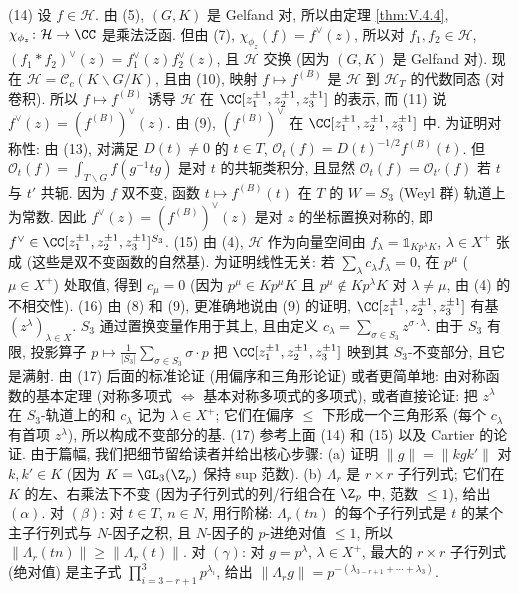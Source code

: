 \begin{solution}
(14) 设 $f \in \mathcal{H}$. 由 (5), $(G, K)$ 是 Gelfand 对, 所以由定理 \ref{thm:V.4.4}, $\chi_{\phi_z} \colon \mathcal{H} \to \CC$ 是乘法泛函. 但由 (7), $\chi_{\phi_z}(f) = f^{\vee}(z)$, 所以对 $f_1, f_2 \in \mathcal{H}$, $(f_1 * f_2)^{\vee}(z) = f_1^{\vee}(z)f_2^{\vee}(z)$, 且 $\mathcal{H}$ 交换 (因为 $(G, K)$ 是 Gelfand 对). 现在 $\mathcal{H} = \mathcal{C}_c(K\backslash G/K)$, 且由 (10), 映射 $f \longmapsto f^{(B)}$ 是 $\mathcal{H}$ 到 $\mathcal{H}_T$ 的代数同态 (对卷积). 所以 $f \mapsto f^{(B)}$ 诱导 $\mathcal{H}$ 在 $\CC[z_1^{\pm 1}, z_2^{\pm 1}, z_3^{\pm 1}]$ 的表示, 而 (11) 说 $f^{\vee}(z) = (f^{(B)})^{\vee}(z)$. 由 (9), $(f^{(B)})^{\vee}$ 在 $\CC[z_1^{\pm 1}, z_2^{\pm 1}, z_3^{\pm 1}]$ 中. 为证明对称性: 由 (13), 对满足 $D(t) \neq 0$ 的 $t \in T$, $\mathcal{O}_t(f) = D(t)^{-1/2}f^{(B)}(t)$. 但 $\mathcal{O}_t(f) = \int_{T\backslash G}f(g^{-1}tg)$ 是对 $t$ 的共轭类积分, 且显然 $\mathcal{O}_t(f) = \mathcal{O}_{t'}(f)$ 若 $t$ 与 $t'$ 共轭. 因为 $f$ 双不变, 函数 $t \longmapsto f^{(B)}(t)$ 在 $T$ 的 $W = S_3$ (Weyl 群) 轨道上为常数. 因此 $f^{\vee}(z) = (f^{(B)})^{\vee}(z)$ 是对 $z$ 的坐标置换对称的, 即 $f^{\vee} \in \CC[z_1^{\pm 1}, z_2^{\pm 1}, z_3^{\pm 1}]^{S_3}$.
(15) 由 (4), $\mathcal{H}$ 作为向量空间由 $f_{\lambda} = \mathbb{1}_{Kp^{\lambda}K}$, $\lambda \in X^+$ 张成 (这些是双不变函数的自然基). 为证明线性无关: 若 $\sum_{\lambda}c_{\lambda}f_{\lambda} = 0$, 在 $p^{\mu}$ ($\mu \in X^+$) 处取值, 得到 $c_{\mu} = 0$ (因为 $p^{\mu} \in Kp^{\mu}K$ 且 $p^{\mu} \notin Kp^{\lambda}K$ 对 $\lambda \neq \mu$, 由 (4) 的不相交性).
(16) 由 (8) 和 (9), 更准确地说由 (9) 的证明, $\CC[z_1^{\pm 1}, z_2^{\pm 1}, z_3^{\pm 1}]$ 有基 $(z^{\lambda})_{\lambda \in X}$. $S_3$ 通过置换变量作用于其上, 且由定义 $c_{\lambda} = \sum_{\sigma \in S_3}z^{\sigma \cdot \lambda}$. 由于 $S_3$ 有限, 投影算子 $p \longmapsto \frac{1}{|S_3|}\sum_{\sigma \in S_3}\sigma \cdot p$ 把 $\CC[z_1^{\pm 1}, z_2^{\pm 1}, z_3^{\pm 1}]$ 映到其 $S_3$-不变部分, 且它是满射. 由 (17) 后面的标准论证 (用偏序和三角形论证) 或者更简单地: 由对称函数的基本定理 (对称多项式 $\Leftrightarrow$ 基本对称多项式的多项式), 或者直接论证: 把 $z^{\lambda}$ 在 $S_3$-轨道上的和 $c_{\lambda}$ 记为 $\lambda \in X^+$; 它们在偏序 $\leq$ 下形成一个三角形系 (每个 $c_{\lambda}$ 有首项 $z^{\lambda}$), 所以构成不变部分的基.
(17) 参考上面 (14) 和 (15) 以及 Cartier 的论证. 由于篇幅, 我们把细节留给读者并给出核心步骤:
(a) 证明 $\|g\| = \|kgk'\|$ 对 $k, k' \in K$ (因为 $K = \GL_3(\Z_p)$ 保持 sup 范数).
(b) $\Lambda_r$ 是 $r \times r$ 子行列式; 它们在 $K$ 的左、右乘法下不变 (因为子行列式的列/行组合在 $\Z_p$ 中, 范数 $\leq 1$), 给出 $(\alpha)$. 对 $(\beta)$: 对 $t \in T$, $n \in N$, 用行阶梯: $\Lambda_r(tn)$ 的每个子行列式是 $t$ 的某个主子行列式与 $N$-因子之积, 且 $N$-因子的 $p$-进绝对值 $\leq 1$, 所以 $\|\Lambda_r(tn)\| \geq \|\Lambda_r(t)\|$. 对 $(\gamma)$: 对 $g = p^{\lambda}$, $\lambda \in X^+$, 最大的 $r \times r$ 子行列式 (绝对值) 是主子式 $\prod_{i=3-r+1}^3 p^{\lambda_i}$, 给出 $\|\Lambda_r g\| = p^{-(\lambda_{3-r+1} + \cdots + \lambda_3)}$.

\end{solution}
